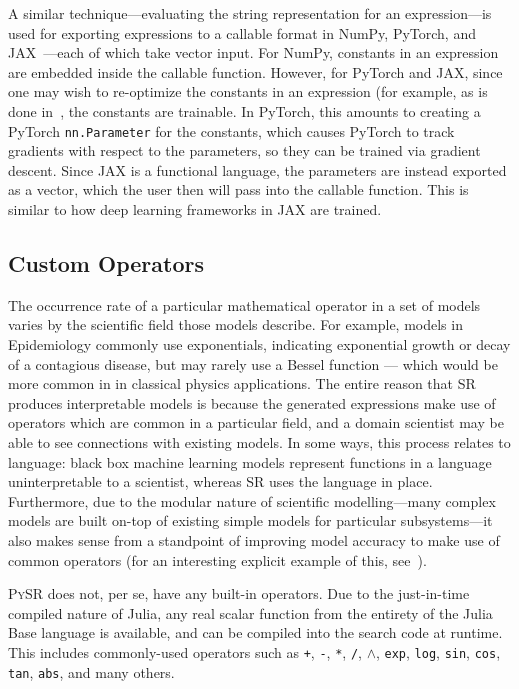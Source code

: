 \documentclass[letterpaper,twocolumn]{scrartcl}
\newcommand\pysr{\textsc{PySR}\xspace}
\newcommand\sr{SR\xspace}
\begin{document}
A similar technique---evaluating the string representation for an expression---is used for exporting expressions to a callable format in NumPy, PyTorch, and JAX~\cite{numpy,torch,jax}---each of which take vector input.
For NumPy, constants in an expression are embedded inside the callable function.
However, for PyTorch and JAX, since one may wish to re-optimize the constants in an expression (for example, as is done in~\cite{lemosRediscoveringNewtonGravity2022}, the constants are trainable.
In PyTorch, this amounts to creating a PyTorch \texttt{nn.Parameter} for the constants, which causes PyTorch to track gradients with respect to the parameters, so they can be trained via gradient descent.
Since JAX is a functional language, the parameters are instead exported as a vector, which the user then will pass into the callable function.
This is similar to how deep learning frameworks in JAX are trained.

\subsection{Custom Operators}
\label{sec:custom_operators}

The occurrence rate of a particular mathematical operator in a set of models varies by the scientific field those models describe.
For example, models in Epidemiology commonly use exponentials, indicating exponential growth or decay of a contagious disease, but may rarely use a Bessel function — which would be more common in in classical physics applications.
The entire reason that \sr produces interpretable models is because the generated expressions make use of operators which are common in a particular field, and a domain scientist may be able to see connections with existing models.
In some ways, this process relates to language: black box machine learning models represent functions in a language uninterpretable to a scientist, whereas \sr uses the language in place.
Furthermore, due to the modular nature of scientific modelling---many complex models are built on-top of existing simple models for particular subsystems---it also makes sense from a standpoint of improving model accuracy to make use of common operators (for an interesting explicit example of this, see~\cite{guimeraBayesianMachineScientist2020}).

\pysr does not, per se, have any built-in operators.
Due to the just-in-time compiled nature of Julia, any real scalar function from the entirety of the Julia Base language is available, and can be compiled into the search code at runtime.
This includes commonly-used operators such as
\texttt{+},
\texttt{-},
\texttt{*},
\texttt{/},
$\wedge$,
\texttt{exp},
\texttt{log},
\texttt{sin},
\texttt{cos},
\texttt{tan},
\texttt{abs},
and many others.
\end{document}
